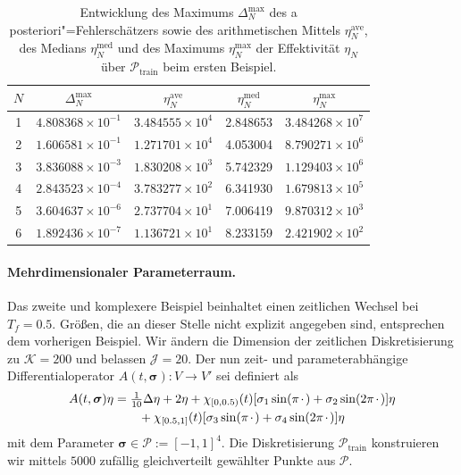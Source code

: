 \documentclass[../main.tex]{subfiles}
\begin{document}
\begin{table}[tb]
    \centering
    \begin{tabular}{|c|c|c|c|c|}\hline
     $N$ & $\Delta_{N}^{\mathrm{max}}$ & $\eta_{N}^{\mathrm{ave}}$ & $\eta_{N}^{\mathrm{med}}$ & $\eta_{N}^{\mathrm{max}}$\\ \hline
     1 & $4.808368{\times}10^{-1}$ & $3.484555{\times}10^{4}$ &  2.848653  & $3.484268{\times}10^{7}$ \\ %
     2 & $1.606581{\times}10^{-1}$ & $1.271701{\times}10^{4}$ &  4.053004  & $8.790271{\times}10^{6}$ \\ %
     3 & $3.836088{\times}10^{-3}$ & $1.830208{\times}10^{3}$ &  5.742329  & $1.129403{\times}10^{6}$ \\ %
     4 & $2.843523{\times}10^{-4}$ & $3.783277{\times}10^{2}$ &  6.341930  & $1.679813{\times}10^{5}$ \\ %
     5 & $3.604637{\times}10^{-6}$ & $2.737704{\times}10^{1}$ &  7.006419  & $9.870312{\times}10^{3}$ \\ %
     6 & $1.892436{\times}10^{-7}$ & $1.136721{\times}10^{1}$ &  8.233159  & $2.421902{\times}10^{2}$ \\ \hline
    \end{tabular}
    \caption[Entwicklung der relevanten Größen der RB"=Methode, erstes Beispiel.]{%
        Entwicklung des Maximums $\Delta_{N}^{\mathrm{max}}$ des a posteriori"=Fehlerschätzers sowie des arithmetischen Mittels $\eta_{N}^{\mathrm{ave}}$, des Medians $\eta_{N}^{\mathrm{med}}$ und des Maximums $\eta_{N}^{\mathrm{max}}$ der Effektivität $\eta_{N}$ über $\mathcal P_{\mathrm{train}}$ beim ersten Beispiel.
    }
    \label{table:entwicklung_rbm}
\end{table}

\paragraph{Mehrdimensionaler Parameterraum.} %

Das zweite und komplexere Beispiel beinhaltet einen zeitlichen Wechsel bei $T_f = 0.5$.
Größen, die an dieser Stelle nicht explizit angegeben sind, entsprechen dem vorherigen Beispiel.
Wir ändern die Dimension der zeitlichen Diskretisierung zu $\mathcal K = 200$ und belassen $\mathcal J = 20$.
Der nun zeit- und parameterabhängige Differentialoperator $A(t, \bm \sigma) \colon V \to V'$ sei definiert als
\begin{equation}
    \begin{aligned}
    A(t, \bm \sigma) \eta &=
        \tfrac{1}{10} \Delta \eta + 2 \eta + \chi_{[0, 0.5)}(t) [\sigma_1 \sin(\pi {\mkern2mu\cdot\mkern2mu}) + \sigma_2 \sin(2 \pi {\mkern2mu\cdot\mkern2mu})] \eta \\
        &\qquad + \chi_{[0.5, 1]}(t) [\sigma_3 \sin(\pi {\mkern2mu\cdot\mkern2mu}) + \sigma_4 \sin(2 \pi {\mkern2mu\cdot\mkern2mu})] \eta
    \end{aligned}
\end{equation}
mit dem Parameter $\bm \sigma \in \mathcal P := [-1, 1]^{4}$.
Die Diskretisierung $\mathcal P_{\mathrm{train}}$ konstruieren wir mittels $5000$ zufällig gleichverteilt gewählter Punkte aus $\mathcal P$.
\end{document}

